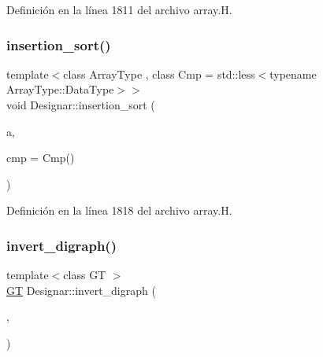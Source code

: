 Definición en la línea 1811 del archivo array.\+H.

\mbox{\label{namespace_designar_a93966614af4a5a6c0bd78fe75af5e7cf}} 
\subsubsection{\texorpdfstring{insertion\+\_\+sort()}{insertion\_sort()}\hspace{0.1cm}{\footnotesize\ttfamily [6/6]}}
{\footnotesize\ttfamily template$<$class Array\+Type , class Cmp  = std\+::less$<$typename Array\+Type\+::\+Data\+Type$>$$>$ \\
void Designar\+::insertion\+\_\+sort (\begin{DoxyParamCaption}\item[{Array\+Type \&}]{a,  }\item[{Cmp \&\&}]{cmp = {\ttfamily Cmp()} }\end{DoxyParamCaption})\hspace{0.3cm}{\ttfamily [inline]}}



Definición en la línea 1818 del archivo array.\+H.

\mbox{\label{namespace_designar_a35a0d2875876e94cc6f9036f85491091}} 
\subsubsection{\texorpdfstring{invert\+\_\+digraph()}{invert\_digraph()}\hspace{0.1cm}{\footnotesize\ttfamily [1/2]}}
{\footnotesize\ttfamily template$<$class GT $>$ \\
\hyperlink{demo-buildgraph_8_c_a3001c40d2c31ca87ed96cd7d1334a55e}{GT} Designar\+::invert\+\_\+digraph (\begin{DoxyParamCaption}\item[{\hyperlink{demo-buildgraph_8_c_a3001c40d2c31ca87ed96cd7d1334a55e}{GT} \&}]{,  }\item[{bool}]{ }\end{DoxyParamCaption})}

\mbox{\label{namespace_designar_a3f14dc1be082db37ea18784d48c92a54}} 
